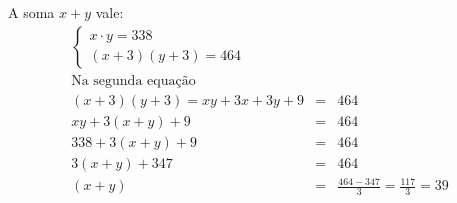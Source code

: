 A soma $x+y$ vale:
\begin{eqnarray*}
		\begin{cases}
				x\cdot y = 338\\
				(x+3)(y+3) = 464
		\end{cases}\\
		\text{Na segunda equação}\\
		(x+3)(y+3) =xy+3x+3y+9 &= & 464\\
						xy+3(x+y)+9 &= & 464\\
						338+3(x+y)+9 &= & 464\\
						3(x+y)+347 &= & 464\\
						(x+y)&= & \frac{464-347}{3} = \frac{117}{3}  =  39
\end{eqnarray*}
